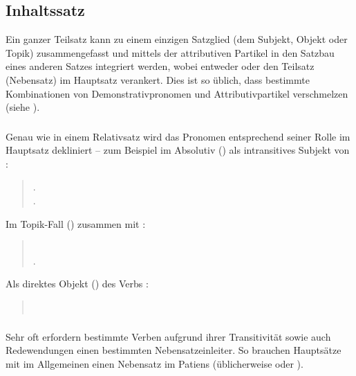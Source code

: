 \subsection{Inhaltssatz} Ein ganzer Teilsatz kann zu einem einzigen Satzglied (dem Subjekt, Objekt oder Topik) zusammengefasst und mittels der attributiven Partikel  in den Satzbau eines anderen Satzes integriert werden, wobei entweder  oder  den Teilsatz (Nebensatz) im Hauptsatz verankert. Dies ist so üblich, dass bestimmte Kombinationen von Demonstrativpronomen und Attributivpartikel verschmelzen (siehe ). \label{syn:clause-nom}

\subsubsection{} Genau wie in einem Relativsatz wird das Pronomen entsprechend seiner Rolle im Hauptsatz dekliniert -- zum Beispiel im Absolutiv () als intransitives Subjekt von :

\begin{quotation}
	\noindent{}.\\
	\indent{}.
\end{quotation}

\noindent Im Topik-Fall () zusammen mit :
\begin{quotation}
	\noindent{}\\
	\indent{}.
\end{quotation}

\noindent Als direktes Objekt () des Verbs :
\begin{quotation}
	\noindent{}\\
	\indent{}
\end{quotation}

\subsubsection{} Sehr oft erfordern bestimmte Verben aufgrund ihrer Transitivität sowie auch Redewendungen einen bestimmten Nebensatzeinleiter. So brauchen Hauptsätze mit   im Allgemeinen einen Nebensatz im Patiens (üblicherweise  oder ).

